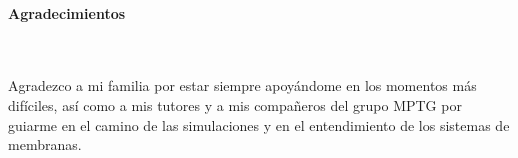 \newpage{\pagestyle{empty}\cleardoublepage}

\newpage
\thispagestyle{empty} \textbf{}\normalsize
\\\\\\%



\newpage
\thispagestyle{empty} \textbf{}\normalsize
\\\\\\%
\textbf{\LARGE Agradecimientos}
\\\\
Agradezco a mi familia por estar siempre apoy\'{a}ndome en los momentos m\'{a}s dif\'{i}ciles, as\'{i} como a mis tutores y a mis compa\~{n}eros del grupo MPTG por guiarme en el camino de las simulaciones y en el entendimiento de los sistemas de membranas.

\newpage{\pagestyle{empty}\cleardoublepage}
